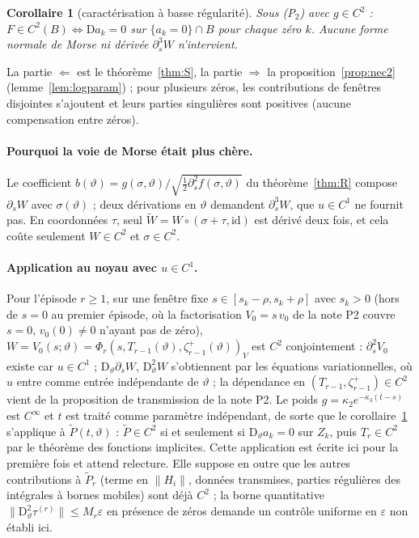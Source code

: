 \documentclass[11pt,a4paper]{article}
\newtheorem{corollaire}[theoreme]{Corollaire}
\theoremstyle{remark}
\newcommand{\vth}{\vartheta}
\newcommand{\D}{\mathrm D}
\begin{document}
\begin{corollaire}[caractérisation à basse régularité]\label{cor:carac2}
Sous (P$_2$) avec $g\in C^2$ : $F\in C^2(B)\iff\D a_k=0$ sur $\{a_k=0\}\cap B$ pour chaque zéro $k$. Aucune forme normale de Morse ni dérivée $\partial_s^3W$ n'intervient.
\end{corollaire}
La partie $\Leftarrow$ est le théorème~\ref{thm:S}, la partie $\Rightarrow$ la proposition~\ref{prop:nec2} (lemme~\ref{lem:logparam}) ; pour plusieurs zéros, les contributions de fenêtres disjointes s'ajoutent et leurs parties singulières sont positives (aucune compensation entre zéros).

\paragraph{Pourquoi la voie de Morse était plus chère.} Le coefficient $b(\vth)=g(\sigma,\vth)/\sqrt{\frac12\partial_s^2f(\sigma,\vth)}$ du théorème~\ref{thm:R} compose $\partial_sW$ avec $\sigma(\vth)$ ; deux dérivations en $\vth$ demandent $\partial_s^3W$, que $u\in C^1$ ne fournit pas. En coordonnées $\tau$, seul $\tilde W=W\circ(\sigma+\tau,\mathrm{id})$ est dérivé deux fois, et cela coûte seulement $W\in C^2$ et $\sigma\in C^2$.

\paragraph{Application au noyau avec $u\in C^1$.} Pour l'épisode $r\ge1$, sur une fenêtre fixe $s\in[s_k-\rho,s_k+\rho]$ avec $s_k>0$ (hors de $s=0$ au premier épisode, où la factorisation $V_0=s\,v_0$ de la note P2 couvre $s=0$, $v_0(0)\ne0$ n'ayant pas de zéro), $W=V_0(s;\vth)=\Phi_r(s,T_{r-1}(\vth),\zeta^+_{r-1}(\vth))_V$ est $C^2$ conjointement : $\partial_s^2V_0$ existe car $u\in C^1$ ; $\D_\vth\partial_sW$, $\D^2_\vth W$ s'obtiennent par les équations variationnelles, où $u$ entre comme entrée indépendante de $\vth$ ; la dépendance en $(T_{r-1},\zeta^+_{r-1})\in C^2$ vient de la proposition de transmission de la note P2. Le poids $g=\kappa_2e^{-\kappa_3(t-s)}$ est $C^\infty$ et $t$ est traité comme paramètre indépendant, de sorte que le corollaire~\ref{cor:carac2} s'applique à $\tilde P(t,\vth)$ : $\tilde P\in C^2$ si et seulement si $\D_\vth a_k=0$ sur $Z_k$, puis $T_r\in C^2$ par le théorème des fonctions implicites. Cette application est écrite ici pour la première fois et attend relecture. Elle suppose en outre que les autres contributions à $\tilde P_r$ (terme en $\lVert H_i\rVert$, données transmises, parties régulières des intégrales à bornes mobiles) sont déjà $C^2$ ; la borne quantitative $\lVert\D^2_\vth\tau^{(r)}\rVert\le M_r\varepsilon$ en présence de zéros demande un contrôle uniforme en $\varepsilon$ non établi ici.
\end{document}
